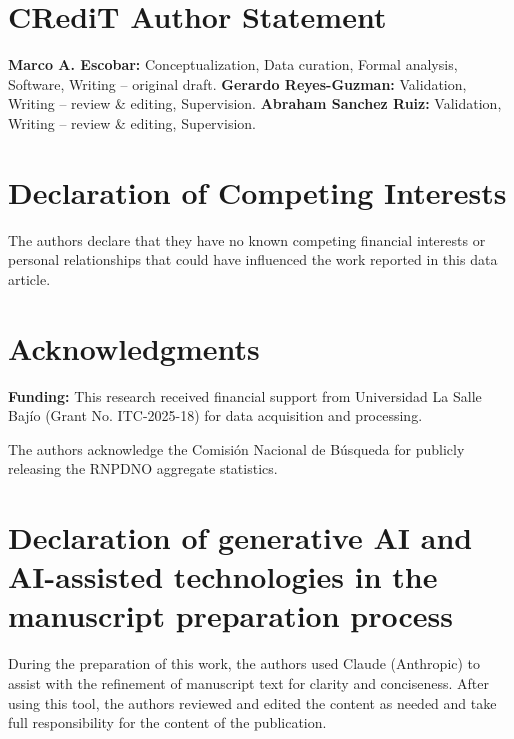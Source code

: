 \documentclass[3p]{elsarticle}
\begin{document}
\section*{CRediT Author Statement}

\textbf{Marco A. Escobar:} Conceptualization, Data curation,
Formal analysis, Software, Writing -- original draft.
\textbf{Gerardo Reyes-Guzman:} Validation,
Writing -- review \& editing, Supervision.
\textbf{Abraham Sanchez Ruiz:} Validation,
Writing -- review \& editing, Supervision.


\section*{Declaration of Competing Interests}

The authors declare that they have no known competing financial
interests or personal relationships that could have influenced
the work reported in this data article.

\section*{Acknowledgments}

\textbf{Funding:} This research received financial support from
Universidad La Salle Bajío (Grant No. ITC-2025-18) for data acquisition and processing.

The authors acknowledge the Comisión Nacional de Búsqueda for
publicly releasing the RNPDNO aggregate statistics.

\section*{Declaration of generative AI and AI-assisted technologies in the manuscript preparation process}

During the preparation of this work, the authors used Claude
(Anthropic) to assist with the refinement of manuscript text for
clarity and conciseness.
After using this tool, the authors reviewed and edited the content
as needed and take full responsibility for the content of the
publication.





\end{document}
